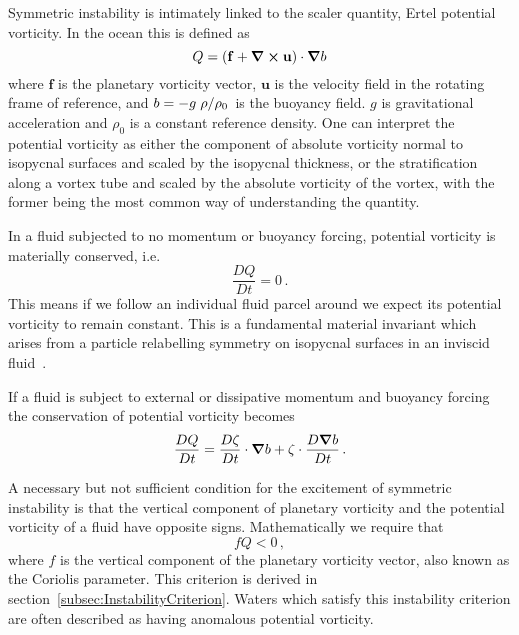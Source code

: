Symmetric instability is intimately linked to the scaler quantity, Ertel potential vorticity. In the ocean this is defined as
\begin{equation}
    \label{eq:PVDefinition}
    Q = (\mathbf{f} + \curl{\mathbf{u}})\cdot\grad b    
\end{equation}
where $\mathbf{f}$ is the planetary vorticity vector, $\mathbf{u}$ is the velocity field in the rotating frame of reference, and $b = -  g \flatfrac{\rho}{\rho_0}$ is the buoyancy field. $g$ is gravitational acceleration and $\rho_0$ is a constant reference density. One can interpret the potential vorticity as either the component of absolute vorticity normal to isopycnal surfaces and scaled by the isopycnal thickness, or the stratification along a vortex tube and scaled by the absolute vorticity of the vortex, with the former being the most common way of understanding the quantity.

In a fluid subjected to no momentum or buoyancy forcing, potential vorticity is materially conserved, i.e.
\begin{equation}
    \frac{DQ}{Dt} = 0 \, .
\end{equation}
This means if we follow an individual fluid parcel around we expect its potential vorticity to remain constant. This is a fundamental material invariant which arises from a particle relabelling symmetry on isopycnal surfaces in an inviscid fluid~\citep{Salmon1998}.

If a fluid is subject to external or dissipative momentum and buoyancy forcing the conservation of potential vorticity  becomes
\begin{equation}
    \frac{DQ}{Dt} = \frac{D\mathbf{\zeta}}{Dt} \cdot  \grad{b} + \mathbf{\zeta} \cdot \frac{D\grad{b}}{Dt} \, .
\end{equation}

A necessary but not sufficient condition for the excitement of symmetric instability is that the vertical component of planetary vorticity and the potential vorticity of a fluid have opposite signs. Mathematically we require that
\begin{equation}
    \label{eq:PVConservation}
    f Q < 0 \, ,
\end{equation}
where $f$ is the vertical component of the planetary vorticity vector, also known as the Coriolis parameter. This criterion is derived in section~\ref{subsec:InstabilityCriterion}. Waters which satisfy this instability criterion are often described as having anomalous potential vorticity.

